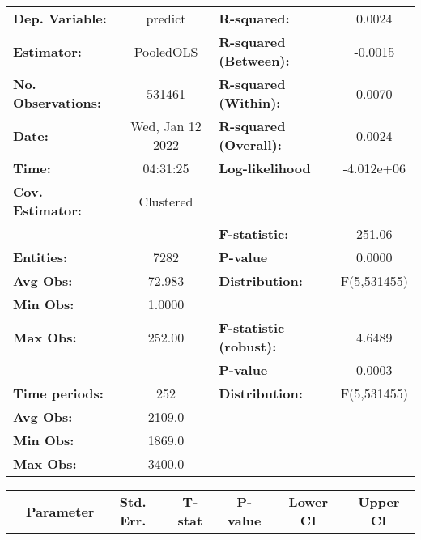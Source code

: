 \begin{center}
\begin{tabular}{lclc}
\toprule
\textbf{Dep. Variable:}    &      predict       & \textbf{  R-squared:         }   &      0.0024      \\
\textbf{Estimator:}        &     PooledOLS      & \textbf{  R-squared (Between):}  &     -0.0015      \\
\textbf{No. Observations:} &       531461       & \textbf{  R-squared (Within):}   &      0.0070      \\
\textbf{Date:}             &  Wed, Jan 12 2022  & \textbf{  R-squared (Overall):}  &      0.0024      \\
\textbf{Time:}             &      04:31:25      & \textbf{  Log-likelihood     }   &    -4.012e+06    \\
\textbf{Cov. Estimator:}   &     Clustered      & \textbf{                     }   &                  \\
\textbf{}                  &                    & \textbf{  F-statistic:       }   &      251.06      \\
\textbf{Entities:}         &        7282        & \textbf{  P-value            }   &      0.0000      \\
\textbf{Avg Obs:}          &       72.983       & \textbf{  Distribution:      }   &   F(5,531455)    \\
\textbf{Min Obs:}          &       1.0000       & \textbf{                     }   &                  \\
\textbf{Max Obs:}          &       252.00       & \textbf{  F-statistic (robust):} &      4.6489      \\
\textbf{}                  &                    & \textbf{  P-value            }   &      0.0003      \\
\textbf{Time periods:}     &        252         & \textbf{  Distribution:      }   &   F(5,531455)    \\
\textbf{Avg Obs:}          &       2109.0       & \textbf{                     }   &                  \\
\textbf{Min Obs:}          &       1869.0       & \textbf{                     }   &                  \\
\textbf{Max Obs:}          &       3400.0       & \textbf{                     }   &                  \\
\bottomrule
\end{tabular}
\begin{tabular}{lcccccc}
                & \textbf{Parameter} & \textbf{Std. Err.} & \textbf{T-stat} & \textbf{P-value} & \textbf{Lower CI} & \textbf{Upper CI}  \\

\end{tabular}
\end{center}
